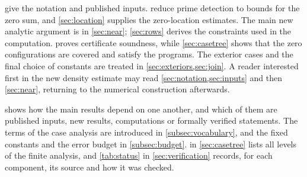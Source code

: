  give the notation and published inputs.
 reduce prime detection to bounds for the zero sum,
and \cref{sec:location} supplies the zero-location estimates. The main new analytic
argument is in \cref{sec:near}; \cref{sec:rows} derives the constraints used in the
computation.  proves certificate soundness, while \cref{sec:casetree} shows
that the zero configurations are covered and satisfy the programs. The exterior cases
and the final choice of constants are treated in \cref{sec:exteriors,sec:join}.
A reader interested first in the new density estimate may read \cref{sec:notation,sec:inputs}
and then \cref{sec:near}, returning to the numerical construction afterwards.

 shows how the main results depend on one another, and which of them are
published inputs, new results, computations or formally verified statements. The terms of the
case analysis are introduced in \cref{subsec:vocabulary}, and the fixed constants and the error
budget in \cref{subsec:budget}.  in \cref{sec:casetree} lists all levels of the
finite analysis, and \cref{tab:status} in \cref{sec:verification} records, for each component,
its source and how it was checked.

